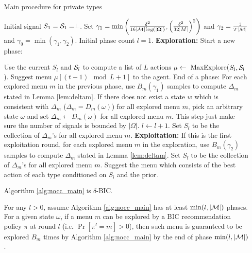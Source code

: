  \begin{algorithm}[H]
    \caption{Main procedure for private types }
    	\label{alg:nocc_main}
    \begin{algorithmic}[1]
    	\STATE Initial signal $S_1 = \S_1= \perp$.
    	\STATE Set $\gamma_1 =\min\left(\frac{\delta^2}{16|\M|\log(|\varOmega|)},\left( \frac{\delta^2}{32|M|}\right)^2\right)$ and $\gamma_2 =  \frac{1}{T|\M|}$ and $\gamma_0=\min(\gamma_1,\gamma_2)$.
	\STATE Initial phase count $l = 1$. 
		\STATE \textbf{Exploration:}
			\STATE Start a new phase:
			
			\STATE Use the current $S_l$ and $\S_l$ to compute a list of $L$ actions $\mu \leftarrow $ MaxExplore($S_l, \S_l$).
		\ENDIF
		\STATE Suggest menu $\mu [ (t-1) \mod L + 1]$ to the agent.
			\STATE End of a phase:
			\STATE For each explored menu $m$ in the previous phase, use $B_m(\gamma_1)$ samples to compute $\Delta_m$ stated in Lemma \ref{lem:deltam}. 
			\STATE If there does not exist a state $w$ which is consistent with $\Delta_m$ ($\Delta_m = D_m(\omega)$) for all explored menu $m$, pick an arbitrary state $\omega$ and set $\Delta_m \leftarrow D_m(\omega)$ for all explored menu $m$. This step just make sure the number of signals is bounded by $|\varOmega|$.
			\STATE $l \leftarrow l + 1$. 
			\STATE Set $S_l$ to be the collection of $\Delta_m$'s for all explored menu $m$.
		\ENDIF
	\ELSE
		\STATE \textbf{Exploitation:} 
		\STATE If this is the first exploitation round, for each explored menu $m$ in the exploration, use $B_m(\gamma_2)$ samples to compute $\Delta_m$ stated in Lemma \ref{lem:deltam}. Set $S_l$ to be the collection of $\Delta_m$'s for all explored menu $m$.
		\STATE Suggest the menu which consists of the best action of each type conditioned on $S_l$ and the prior. 
	\ENDIF
	\ENDFOR
     \end{algorithmic}
\end{algorithm}


\begin{claim}
\label{clm:nocc_BIC}
Algorithm \ref{alg:nocc_main} is $\delta$-BIC.
\end{claim}


\begin{lemma}
\label{lem:exp_nocc}
For any $l > 0$, assume Algorithm \ref{alg:nocc_main} has at least $\min(l, |\M|)$ phases. 
For a given state $\omega$, if a menu $m$ can be explored by a BIC recommendation policy $\pi$ at round $l$ (i.e. $ \Pr[\pi^l= m]> 0$), then such menu is guaranteed to be explored $B_m$ times by Algorithm \ref{alg:nocc_main} by the end of phase $\min(l, |\M|)$. 
\end{lemma}

